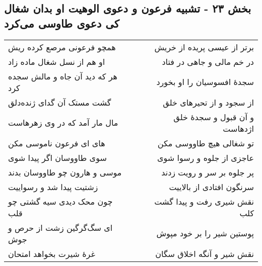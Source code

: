 \begin{center}
\section*{بخش ۲۳ - تشبیه فرعون و دعوی الوهیت او بدان  شغال کی دعوی طاوسی می‌کرد}
\label{sec:sh023}
\begin{longtable}{l p{0.5cm} r}
همچو فرعونی مرصع کرده ریش
&&
برتر از عیسی پریده از خریش
\\
او هم از نسل شغال ماده زاد
&&
در خم مالی و جاهی در فتاد
\\
هر که دید آن جاه و مالش سجده کرد
&&
سجدهٔ افسوسیان را او بخورد
\\
گشت مستک آن گدای ژنده‌دلق
&&
از سجود و از تحیرهای خلق
\\
مال مار آمد که در وی زهرهاست
&&
و آن قبول و سجدهٔ خلق اژدهاست
\\
های ای فرعون ناموسی مکن
&&
تو شغالی هیچ طاووسی مکن
\\
سوی طاووسان اگر پیدا شوی
&&
عاجزی از جلوه و رسوا شوی
\\
موسی و هارون چو طاووسان بدند
&&
پر جلوه بر سر و رویت زدند
\\
زشتیت پیدا شد و رسواییت
&&
سرنگون افتادی از بالاییت
\\
چون محک دیدی سیه گشتی چو قلب
&&
نقش شیری رفت و پیدا گشت کلب
\\
ای سگ‌گرگین زشت از حرص و جوش
&&
پوستین شیر را بر خود مپوش
\\
غرهٔ شیرت بخواهد امتحان
&&
نقش شیر و آنگه اخلاق سگان
\\
\end{longtable}
\end{center}
